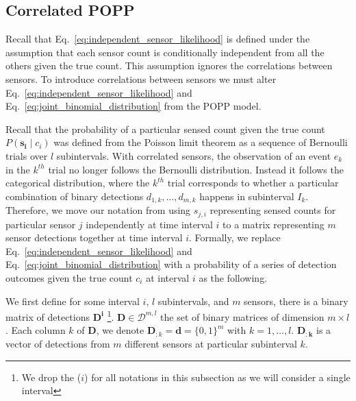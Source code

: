 
\subsection{Correlated POPP}
\label{subsec:cpop}

Recall that Eq.~\ref{eq:independent_sensor_likelihood} is defined under the assumption that each sensor count is conditionally independent from all the others given the true count. This assumption ignores the correlations between sensors. To introduce correlations between sensors we must alter Eq.~\ref{eq:independent_sensor_likelihood} and
Eq.~\ref{eq:joint_binomial_distribution} from the POPP model.

Recall that the probability of a particular sensed count given the true count $P(\mathbf{s_i} \mid c_i)$ was defined from the Poisson limit theorem as a sequence of Bernoulli trials over $l$ subintervals. With correlated sensors, the observation of an event $e_k$ in the $k^{th}$ trial no longer follows the Bernoulli distribution. Instead it follows the categorical distribution, where the $k^{th}$ trial corresponds to whether a particular combination of binary detections $d_{1,k}, \ldots, d_{m,k}$ happens in subinterval $I_k$. Therefore, we move our notation from using $s_{j, i}$ representing sensed counts for particular sensor $j$ independently at time interval $i$ to a matrix representing $m$ sensor detections together at time interval $i$. Formally, we replace Eq.~\ref{eq:independent_sensor_likelihood} and Eq.~\ref{eq:joint_binomial_distribution} with a probability of a series of detection outcomes given the true count $c_i$ at interval $i$ as the following.

We first define for some interval $i$, $l$ subintervals, and $m$ sensors, there is a binary matrix of detections $\mathbf{D^i}$ \footnote{We drop the ($i$) for all notations in this subsection as we will consider a single interval}. $\mathbf{D} \in \mathcal{D}^{m , l}$ the set of binary matrices of dimension $m \times l$. Each column $k$ of $\mathbf{D}$, we denote $\mathbf{D}_{:k} = \mathbf{d} = \{0, 1\}^m$ with $k = 1, \ldots, l$. $\mathbf{D_{:k}}$ is a vector of detections from $m$ different sensors at particular subinterval $k$. 


